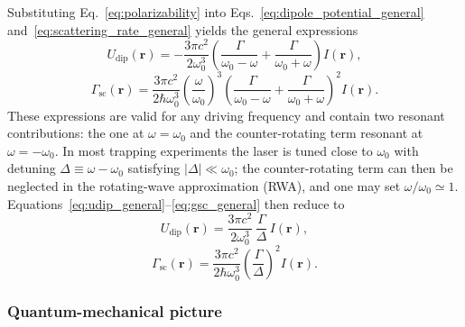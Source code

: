 Substituting Eq.~\ref{eq:polarizability} into Eqs.~\ref{eq:dipole_potential_general} and~\ref{eq:scattering_rate_general} yields the general expressions~\cite{Grimm:00}
\begin{equation}
U_{\mathrm{dip}}(\mathbf{r}) = -\frac{3\pi c^2}{2\omega_0^3}\left(\frac{\Gamma}{\omega_0-\omega} + \frac{\Gamma}{\omega_0+\omega}\right)I(\mathbf{r}),
\label{eq:udip_general}
\end{equation}
\begin{equation}
\Gamma_{\mathrm{sc}}(\mathbf{r}) = \frac{3\pi c^2}{2\hbar\omega_0^3}\left(\frac{\omega}{\omega_0}\right)^3\left(\frac{\Gamma}{\omega_0-\omega} + \frac{\Gamma}{\omega_0+\omega}\right)^2 I(\mathbf{r}).
\label{eq:gsc_general}
\end{equation}
These expressions are valid for any driving frequency and contain two resonant contributions: the one at $\omega = \omega_0$ and the counter-rotating term resonant at $\omega = -\omega_0$. In most trapping experiments the laser is tuned close to $\omega_0$ with detuning $\Delta \equiv \omega - \omega_0$ satisfying $|\Delta| \ll \omega_0$; the counter-rotating term can then be neglected in the rotating-wave approximation (RWA), and one may set $\omega/\omega_0 \simeq 1$. Equations~\ref{eq:udip_general}--\ref{eq:gsc_general} then reduce to~\cite{Grimm:00}
\begin{equation}
U_{\mathrm{dip}}(\mathbf{r}) = \frac{3\pi c^2}{2\omega_0^3}\,\frac{\Gamma}{\Delta}\,I(\mathbf{r}),
\label{eq:udip_rwa}
\end{equation}
\begin{equation}
\Gamma_{\mathrm{sc}}(\mathbf{r}) = \frac{3\pi c^2}{2\hbar\omega_0^3}\left(\frac{\Gamma}{\Delta}\right)^2 I(\mathbf{r}).
\label{eq:gsc_rwa}
\end{equation}

\subsubsection{Quantum-mechanical picture}

